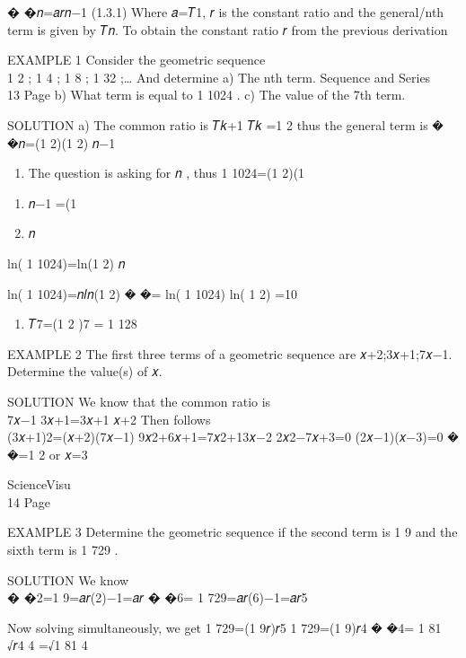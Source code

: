 \documentclass[
  letterpaper,
  DIV=11,
  numbers=noendperiod]{scrreprt}
\providecommand{\tightlist}{%
  \setlength{\itemsep}{0pt}\setlength{\parskip}{0pt}}\usepackage{longtable,booktabs,array}
\begin{document}
� �𝑛=𝑎𝑟𝑛−1 (1.3.1) Where 𝑎=𝑇1, 𝑟 is the constant ratio and the
general/nth term is given by 𝑇𝑛. To obtain the constant ratio 𝑟 from the
previous derivation

EXAMPLE 1 Consider the geometric sequence\\
1 2 ; 1 4 ; 1 8 ; 1 32 ;\ldots{} And determine a) The nth term. Sequence
and Series\\
13 \textbar{} Page b) What term is equal to 1 1024 . c) The value of the
7th term.

SOLUTION a) The common ratio is 𝑇𝑘+1 𝑇𝑘 =1 2 thus the general term is �
�𝑛=(1 2)(1 2) 𝑛−1

\begin{enumerate}
\def\labelenumi{\alph{enumi})}
\setcounter{enumi}{1}
\tightlist
\item
  The question is asking for 𝑛 , thus 1 1024=(1 2)(1
\end{enumerate}

\begin{enumerate}
\def\labelenumi{\arabic{enumi})}
\setcounter{enumi}{1}
\tightlist
\item
  𝑛−1 =(1
\item
  𝑛
\end{enumerate}

ln( 1 1024)=ln(1 2) 𝑛

ln( 1 1024)=𝑛𝑙𝑛(1 2) � �= ln( 1 1024) ln( 1 2) =10

\begin{enumerate}
\def\labelenumi{\alph{enumi})}
\setcounter{enumi}{2}
\tightlist
\item
  𝑇7=(1 2 )7 = 1 128
\end{enumerate}

EXAMPLE 2 The first three terms of a geometric sequence are
𝑥+2;3𝑥+1;7𝑥−1. Determine the value(s) of 𝑥.

SOLUTION We know that the common ratio is\\
7𝑥−1 3𝑥+1=3𝑥+1 𝑥+2 Then follows\\
(3𝑥+1)2=(𝑥+2)(7𝑥−1) 9𝑥2+6𝑥+1=7𝑥2+13𝑥−2 2𝑥2−7𝑥+3=0 (2𝑥−1)(𝑥−3)=0 � �=1 2
or 𝑥=3

ScienceVisu\\
14 \textbar{} Page

EXAMPLE 3 Determine the geometric sequence if the second term is 1 9 and
the sixth term is 1 729 .

SOLUTION We know\\
� �2=1 9=𝑎𝑟(2)−1=𝑎𝑟 � �6= 1 729=𝑎𝑟(6)−1=𝑎𝑟5

Now solving simultaneously, we get 1 729=(1 9𝑟)𝑟5 1 729=(1 9)𝑟4 � �4= 1
81 √𝑟4 4 =√1 81 4
\end{document}
